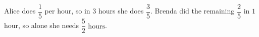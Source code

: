 Alice does $\dfrac15$ per hour, so in $3$ hours she does $\dfrac35$. Brenda did the remaining $\dfrac25$ in $1$ hour, so alone she needs $\boxed{\dfrac52\text{ hours}}$.
